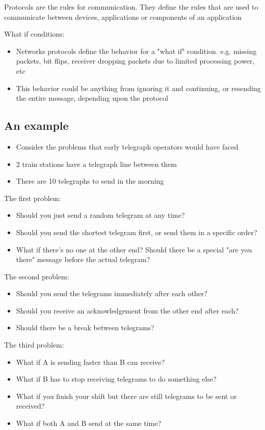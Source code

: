 
Protocols are the rules for communication.
They define the rules that are used to communicate between devices, applications or components of an application 

What if conditions:
\begin{itemize}
  \item Networks protocols define the behavior for a "what if" condition. e.g. missing packets, bit flips, receiver dropping packets due to limited processing power, etc
  \item This behavior could be anything from ignoring it and continuing, or resending the entire message, depending upon the protocol
\end{itemize}

\subsection*{An example}

\begin{itemize}
  \item Consider the problems that early telegraph operators would have faced
  \item 2 train stations have a telegraph line between them
  \item There are 10 telegraphs to send in the morning
\end{itemize}

The first problem:
\begin{itemize}
  \item Should you just send a random telegram at any time?
  \item Should you send the shortest telegram first, or send them in a specific order?
  \item What if there's no one at the other end? Should there be a special "are you there" message before the actual telegram?
\end{itemize}

The second problem:
\begin{itemize}
  \item Should you send the telegrams immediately after each other?
  \item Should you receive an acknowledgement from the other end after each?
  \item Should there be a break between telegrams?
\end{itemize}

The third problem:
\begin{itemize}
  \item What if A is sending faster than B can receive?
  \item What if B has to stop receiving telegrams to do something else?
  \item What if you finish your shift but there are still telegrams to be sent or received?
  \item What if both A and B send at the same time?
\end{itemize}

